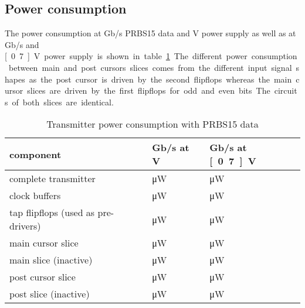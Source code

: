 \subsection{Power consumption}

The power consumption at \unit[10]{Gb/s} PRBS15 data and \unit[1]{V} power supply as well as at \unit[2]{Gb/s} and \unit[0.7]{V} power supply is shown in table \ref{tab:power_consumption_tx}. The different power consumption between main and post cursors slices comes from the different input signal shapes as the post cursor is driven by the second flipflops whereas the main cursor slices are driven by the first flipflops for odd and even bits. The circuits of both slices are identical.

\begin{table}[H]
  \centering
  \begin{tabular}{l|l|l}
    component & \unit[10]{Gb/s} at \unit[1]{V} & \unit[2]{Gb/s} at \unit[0.7]{V}\\
    \hline
    complete transmitter &  \unit[37933]{\uW} & \unit[5720]{\uW}\\
    clock buffers & \unit[23523]{\uW} &  \unit[2221]{\uW}\\
    tap flipflops (used as pre-drivers) & \unit[3610]{\uW} &  \unit[390]{\uW}\\
    main cursor slice &  \unit[1239]{\uW} &  \unit[377]{\uW}\\
    main slice (inactive) &  \unit[1,548]{\uW} &  \unit[0,4]{\uW}\\
    post cursor slice &  \unit[1189]{\uW} &  \unit[423]{\uW}\\
    post slice (inactive) &  \unit[1,802]{\uW} &  \unit[0,4]{\uW}\\      
  \end{tabular}
  \caption{Transmitter power consumption with PRBS15 data}
  \label{tab:power_consumption_tx}
\end{table}
